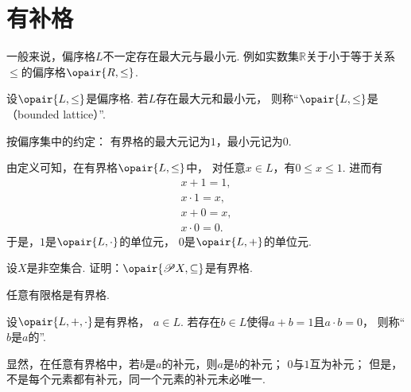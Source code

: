 \section{有补格}
一般来说，偏序格\(L\)不一定存在最大元与最小元.
例如实数集\(\mathbb{R}\)关于小于等于关系\(\leq\)的偏序格\(\opair{R,\leq}\).

\begin{definition}
设\(\opair{L,\leq}\)是偏序格.
若\(L\)存在最大元和最小元，
则称“\(\opair{L,\leq}\)是（bounded lattice）”.
\end{definition}

按偏序集中的约定：
有界格的最大元记为\(1\)，最小元记为\(0\).

由定义可知，在有界格\(\opair{L,\leq}\)中，
对任意\(x \in L\)，有\(0 \leq x \leq 1\).
进而有\begin{gather*}
	x + 1 = 1, \\
	x \cdot 1 = x, \\
	x + 0 = x, \\
	x \cdot 0 = 0.
\end{gather*}
于是，\(1\)是\(\opair{L,\cdot}\)的单位元，
\(0\)是\(\opair{L,+}\)的单位元.

\begin{example}
设\(X\)是非空集合.
证明：\(\opair{\Powerset X,\subseteq}\)是有界格.
\end{example}

\begin{proposition}
任意有限格是有界格.
\end{proposition}

\begin{definition}
设\(\opair{L,+,\cdot}\)是有界格，
\(a \in L\).
若存在\(b \in L\)使得\(a + b = 1\)且\(a \cdot b = 0\)，
则称“\(b\)是\(a\)的”.
\end{definition}

显然，在任意有界格中，若\(b\)是\(a\)的补元，则\(a\)是\(b\)的补元；
\(0\)与\(1\)互为补元；
但是，不是每个元素都有补元，同一个元素的补元未必唯一.
